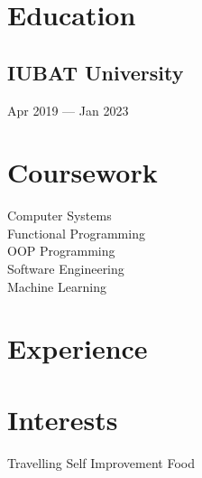 \documentclass[]{deedy-resume-openfont}
\begin{document}
\begin{minipage}[t]{0.33\textwidth} 


\section{Education} 

\subsection{IUBAT University}
Apr 2019 — Jan 2023
\sectionsep


\section{Coursework}
Computer Systems \\
Functional Programming \\
OOP Programming \\
Software Engineering \\
Machine Learning \\


\section{Experience}
\sectionsep


\section{Interests}
Travelling \textbullet{} Self Improvement \textbullet{} Food


\end{minipage}%
\end{document}
